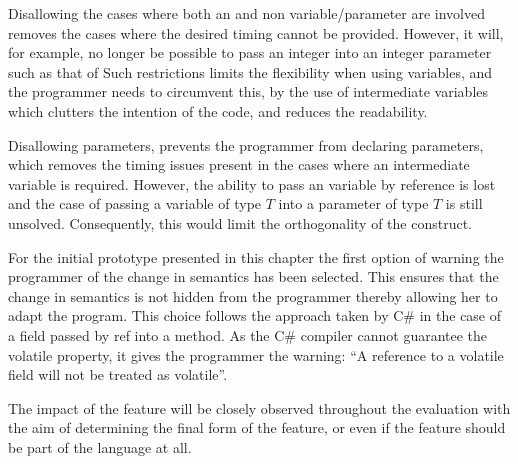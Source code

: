 Disallowing the  cases where both an  and non  variable/parameter are involved removes the cases where the desired timing cannot be provided. However, it will, for example, no longer be possible to pass an  integer into an  integer parameter such as that of  Such restrictions limits the flexibility when using  variables, and the programmer needs to circumvent this,  by the use of intermediate variables which clutters the intention of the code, and reduces the readability.

Disallowing  parameters, prevents the programmer from declaring  parameters, which removes the timing issues present in the cases where an intermediate  variable is required. However, the ability to pass an  variable by reference is lost and the case of passing a variable of type  $T$ into a parameter of type $T$ is still unsolved. Consequently, this would limit the orthogonality of the  construct.

For the initial prototype presented in this chapter the first option of warning the programmer of the change in semantics has been selected. This ensures that the change in semantics is not hidden from the programmer thereby allowing her to adapt the program. This choice follows the approach taken by C\# in the case of a  field passed by ref into a method. As the C\# compiler cannot guarantee the volatile property, it gives the programmer the warning: ``A reference to a volatile field will not be treated as volatile''.

The impact of the feature will be closely observed throughout the evaluation with the aim of determining the final form of the feature, or even if the feature should be part of the language at all.


\worksheetend